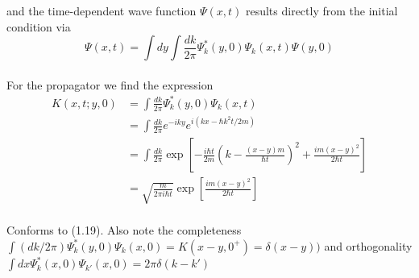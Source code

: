 and the time-dependent wave function $\Psi(x, t)$ results directly from the initial condition
via
\\
\begin{equation}
\Psi(x, t)=\int d y \int \frac{d k}{2 \pi} \Psi_{k}^{*}(y, 0) \Psi_{k}(x, t) \Psi(y, 0)
\end{equation}\\
For the propagator we find the expression
\\
\begin{equation}
\begin{aligned} K(x, t ; y, 0) &=\int \frac{d k}{2 \pi} \Psi_{k}^{*}(y, 0) \Psi_{k}(x, t) \\ &=\int \frac{d k}{2 \pi} e^{-i k y} e^{i\left(k x-\hbar k^{2} t / 2 m\right)} \\ &=\int \frac{d k}{2 \pi} \exp \left[-\frac{i \hbar t}{2 m}\left(k-\frac{(x-y) m}{\hbar t}\right)^{2}+\frac{i m(x-y)^{2}}{2 \hbar t}\right] \\ &=\sqrt{\frac{m}{2 \pi i \hbar t}} \exp \left[\frac{i m(x-y)^{2}}{2 \hbar t}\right] \end{aligned}
\end{equation}\\
Conforms to (1.19). Also note the completeness
$\int(dk/2\pi)\Psi^*_k(y,0)\Psi_k(x,0)=K(x-y, 0^+)=\delta(x-y))$ and orthogonality $\int dx\Psi^*_k(x,0)\Psi_{k'}(x,0)=2\pi \delta(k-k')$
